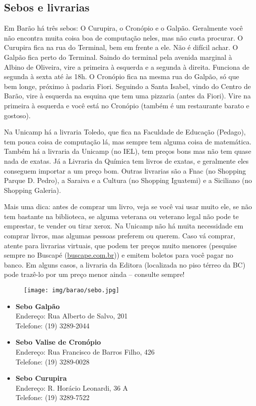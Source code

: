 \subsection{Sebos e livrarias}

Em Barão há três sebos: O Curupira, o Cronópio e o Galpão. Geralmente você não
encontra muita coisa boa de computação neles, mas não custa procurar. O
Curupira fica na rua do Terminal, bem em frente a ele. Não é difícil achar. O
Galpão fica perto do Terminal. Saindo do terminal pela avenida marginal à
Albino de Oliveira, vire a primeira à esquerda e a segunda à direita. Funciona
de segunda à sexta até às 18h. O Cronópio fica na mesma rua do Galpão, só que
bem longe, próximo à padaria Fiori. Seguindo a Santa Isabel, vindo do Centro de
Barão, vire à esquerda na esquina que tem uma pizzaria (antes da Fiori). Vire
na primeira à esquerda e você está no Cronópio (também é um restaurante barato
e gostoso).

Na Unicamp há a livraria Toledo, que fica na Faculdade de Educação (Pedago),
tem pouca coisa de computação lá, mas sempre tem alguma coisa de matemática.
Também há a livraria da Unicamp (no IEL), tem preços bons mas não tem quase
nada de exatas. Já a Livraria da Química tem livros de exatas, e geralmente
eles conseguem importar a um preço bom. Outras livrarias são a Fnac (no
Shopping Parque D. Pedro), a Saraiva e a Cultura (no Shopping Iguatemi) e a
Siciliano (no Shopping Galeria).

Mais uma dica: antes de comprar um livro, veja se você vai usar muito ele, se
não tem bastante na biblioteca, se alguma veterana ou veterano legal não pode
te emprestar, te vender ou tirar xerox. Na Unicamp não há muita necessidade em
comprar livros, mas algumas pessoas preferem ou querem. Caso vá comprar, atente
para livrarias virtuais, que podem ter preços muito menores (pesquise sempre no
Buscapé (\url{buscape.com.br})) e emitem boletos para você pagar no banco. Em
alguns casos, a livraria da Editora (localizada no piso térreo da BC) pode
trazê-lo por um preço menor ainda -- consulte sempre!

\begin{figure}[h!]
    \centering
    \texttt{[image: img/barao/sebo.jpg]}
\end{figure}

\begin{itemize}
    \item \textbf{Sebo Galpão}
        \\Endereço: Rua Alberto de Salvo, 201
        \\Telefone: (19) 3289-2044

    \item \textbf{Sebo Valise de Cronópio}
        \\Endereço: Rua Francisco de Barros Filho, 426
        \\Telefone: (19) 3289-0028

    \item \textbf{Sebo Curupira}
        \\Endereço: R. Horácio Leonardi, 36 A
        \\Telefone: (19) 3289-7522
\end{itemize}

